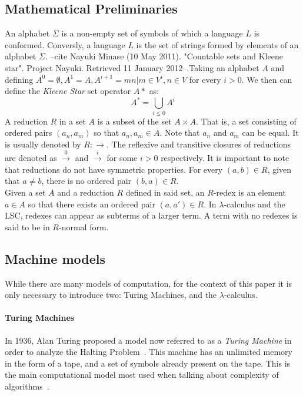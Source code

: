 \message{ !name(VU-CS-BSc-thesis-template.tex)}\documentclass[11pt]{article}
\begin{document}
 \subsection{Mathematical Preliminaries}
 An alphabet $\Sigma$ is a non-empty set of symbols of which a language $L$ is conformed. Conversly, a language $L$ is the set of strings formed by elements of an alphabet $\Sigma$.
 --cite Nayuki Minase (10 May 2011). "Countable sets and Kleene star". Project Nayuki. Retrieved 11 January 2012--.Taking an alphabet $A$ and defining $A^0 = \emptyset , A^1 = A , A^{i + 1} = {mn | m \in V^i, n \in V}$ for every $i > 0$.
 We then can define the \textit{Kleene Star} set operator $A*$ as:
 \begin{equation}
   A^* =  \bigcup_{i \leq 0}A^i
 \end{equation}
 A reduction $R$ in a set $A$ is a subset of the set $A \times A$. That is, a set consisting of ordered pairs $(a_n,a_m)$ so that $a_n,a_m \in A$. Note that $a_n$ and $a_m$ can be equal. It is usually denoted by $R : \rightarrow$.
 The reflexive and transitive closures of reductions are denoted as $\xrightarrow{0}$ and $\xrightarrow{i}$ for some $i > 0$ respectively. It is important to note that reductions do not have symmetric properties. For every $(a,b) \in R$, given that $a \neq b$, there is no ordered pair $(b,a) \in R$. \\
 Given a set $A$ and a reduction $R$ defined in said set, an $R$-redex is an element $a \in A$ so that there exists an ordered pair $(a,a') \in R$. In $\lambda$-calculus and the LSC, redexes can appear as subterms of a larger term. A term with no redexes is said to be in $R$-normal form.
\subsection{Machine models}
While there are many models of computation, for the context of this paper it is only necessary to introduce two: Turing Machines, and the $\lambda$-calculus.

\paragraph{Turing Machines}
In 1936, Alan Turing proposed a model now referred to as a \textit{Turing Machine} in order to analyze the Halting Problem~\cite{on-computable-numbers}. This machine has an unlimited memory in the form of a tape, and a set of symbols already present on the tape. This is the main computational model most used when talking about complexity of algorithms~\cite{computation-theory}.
\end{document}
